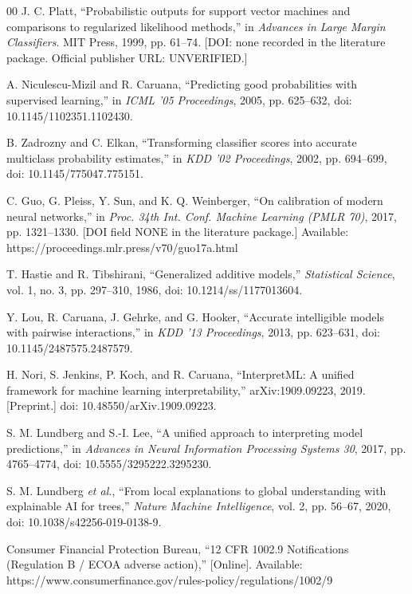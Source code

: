 \documentclass{ieeeaccess}
\begin{document}
\begin{thebibliography}{00}
 J. C. Platt, ``Probabilistic outputs for support vector machines and comparisons to regularized likelihood methods,'' in \emph{Advances in Large Margin Classifiers}. MIT Press, 1999, pp. 61--74. [DOI: none recorded in the literature package. Official publisher URL: UNVERIFIED.]

 A. Niculescu-Mizil and R. Caruana, ``Predicting good probabilities with supervised learning,'' in \emph{ICML '05 Proceedings}, 2005, pp. 625--632, doi: 10.1145/1102351.1102430.

 B. Zadrozny and C. Elkan, ``Transforming classifier scores into accurate multiclass probability estimates,'' in \emph{KDD '02 Proceedings}, 2002, pp. 694--699, doi: 10.1145/775047.775151.

 C. Guo, G. Pleiss, Y. Sun, and K. Q. Weinberger, ``On calibration of modern neural networks,'' in \emph{Proc. 34th Int. Conf. Machine Learning (PMLR 70)}, 2017, pp. 1321--1330. [DOI field NONE in the literature package.] Available: https://proceedings.mlr.press/v70/guo17a.html

 T. Hastie and R. Tibshirani, ``Generalized additive models,'' \emph{Statistical Science}, vol. 1, no. 3, pp. 297--310, 1986, doi: 10.1214/ss/1177013604.

 Y. Lou, R. Caruana, J. Gehrke, and G. Hooker, ``Accurate intelligible models with pairwise interactions,'' in \emph{KDD '13 Proceedings}, 2013, pp. 623--631, doi: 10.1145/2487575.2487579.

 H. Nori, S. Jenkins, P. Koch, and R. Caruana, ``InterpretML: A unified framework for machine learning interpretability,'' arXiv:1909.09223, 2019. [Preprint.] doi: 10.48550/arXiv.1909.09223.

 S. M. Lundberg and S.-I. Lee, ``A unified approach to interpreting model predictions,'' in \emph{Advances in Neural Information Processing Systems 30}, 2017, pp. 4765--4774, doi: 10.5555/3295222.3295230.

 S. M. Lundberg \emph{et al.}, ``From local explanations to global understanding with explainable AI for trees,'' \emph{Nature Machine Intelligence}, vol. 2, pp. 56--67, 2020, doi: 10.1038/s42256-019-0138-9.

 Consumer Financial Protection Bureau, ``12 CFR 1002.9 Notifications (Regulation B / ECOA adverse action),'' [Online]. Available: https://www.consumerfinance.gov/rules-policy/regulations/1002/9


\end{thebibliography}
\end{document}
